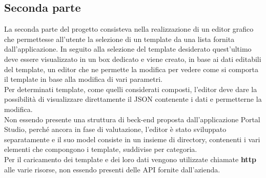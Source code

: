 \subsection{Seconda parte}
La seconda parte del progetto consisteva nella realizzazione di un editor grafico che permettesse all'utente la selezione di un template da una lista fornita dall'applicazione.
In seguito alla selezione del template desiderato quest'ultimo deve essere visualizzato in un box dedicato e viene creato, in base ai dati editabili del template, un editor che ne permette la modifica per vedere come si comporta il template in base alla modifica di vari parametri.	\\
Per determinati template, come quelli considerati composti, l'editor deve dare la possibilità di visualizzare direttamente il JSON contenente i dati e permetterne la modifica.\\
Non essendo presente una struttura di beck-end proposta dall'applicazione Portal Studio, perché ancora in fase di valutazione, l'editor è stato sviluppato separatamente e il suo model consiste in un insieme di directory, contenenti i vari elementi che compongono i template, suddivise per categoria.\\
Per il caricamento dei template e dei loro dati vengono utilizzate chiamate \textbf{http} alle varie risorse, non essendo presenti delle API fornite dall'azienda.

